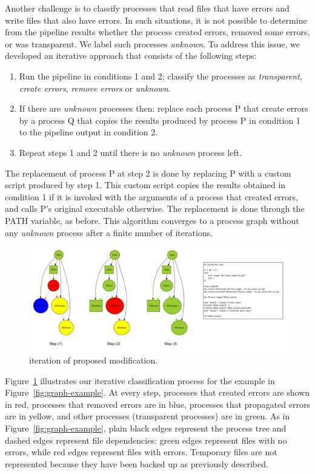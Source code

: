 \documentclass{article}
\begin{document}
Another challenge is to classify processes that read files that have
errors and write files that also have errors. In such situations, it
is not possible to determine from the pipeline results whether
the process created errors, removed some errors, or was
transparent. We label such processes \emph{unknown}. To address this issue, we developed an iterative approach that consists of the following steps:
\begin{enumerate}
  \item Run the pipeline in conditions 1 and 2; classify the
    processes as \emph{transparent}, \emph{create errors},
    \emph{remove errors} or \emph{unknown}.
  \item If there are \emph{unknown} processes then: replace each process P that create errors by a process Q that
    copies the results produced by process P in condition 1 to the pipeline output in condition 2.
  \item Repeat steps 1 and 2 until there is no \emph{unknown} process left.
\end{enumerate}
The replacement of process P at step 2 is done by replacing P
with a custom script produced by step 1. This custom script
copies the results obtained in condition 1 if it is invoked with the
arguments of a process that created errors, and calls P's original
executable otherwise. The replacement is done through the PATH variable, as before. This algorithm converges to a process graph
without any \emph{unknown} process after a finite number of iterations.

\begin{figure}
  \includegraphics[scale=0.3]{images/iterative_modif}
  \caption{iteration of proposed modification.}
  \label{fig:iterations}
\end{figure}

Figure~\ref{fig:iterations} illustrates our iterative classification 
process for the example in Figure~\ref{fig:graph-example}. At every 
step, processes that created errors are shown in red, processes that 
removed errors are in blue, processes that propagated errors are in 
yellow, and other processes (transparent processes) are in green. As in 
Figure~\ref{fig:graph-example}, plain black edges represent the process 
tree and dashed edges represent file dependencies: green edges 
represent files with no errors, while red edges represent files with 
errors. Temporary files are not represented because they have been 
backed up as previously described.
\end{document}
